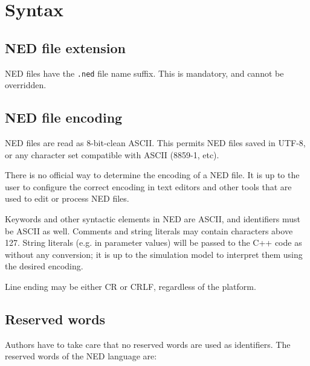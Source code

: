 \label{cha:ned-ref}

\section{Syntax}

\subsection{NED file extension}

NED files have the \texttt{.ned} file name suffix. This is mandatory, and
cannot be overridden.

\subsection{NED file encoding}

NED files are read as 8-bit-clean ASCII. This permits NED files saved
in UTF-8, or any character set compatible with ASCII (8859-1, etc).

\begin{note}
    There is no official way to determine the encoding of a NED file. It is up
    to the user to configure the correct encoding in text editors and other
    tools that are used to edit or process NED files.
\end{note}

Keywords and other syntactic elements in NED are ASCII, and identifiers must be
ASCII as well. Comments and string literals may contain characters above
127. String literals (e.g. in parameter values) will be passed to the C++ code
as  without any conversion; it is up to the simulation model
to interpret them using the desired encoding.

Line ending may be either CR or CRLF, regardless of the platform.


\subsection{Reserved words}

Authors have to take care that no reserved words are used as identifiers.
The reserved words of the NED language are:



